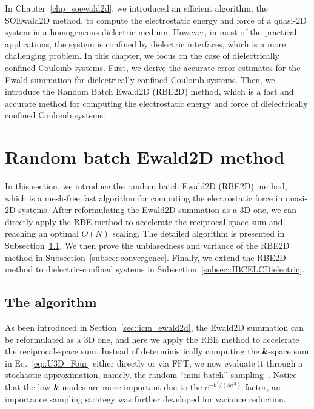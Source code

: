 In Chapter~\ref{chp_soewald2d}, we introduced an efficient algorithm, the SOEwald2D method, to compute the electrostatic energy and force of a quasi-2D system in a homogeneous dielectric medium.
However, in most of the practical applications, the system is confined by dielectric interfaces, which is a more challenging problem.
In this chapter, we focus on the case of dielectrically confined Coulomb systems.
First, we derive the accurate error estimates for the Ewald summation for dielectrically confined Coulomb systems.
Then, we introduce the Random Batch Ewald2D (RBE2D) method, which is a fast and accurate method for computing the electrostatic energy and force of dielectrically confined Coulomb systems.

\section{Random batch Ewald2D method}\label{sec::RBE2D}

In this section, we introduce the random batch Ewald2D (RBE2D) method, which is a mesh-free fast algorithm for computing the electrostatic force in quasi-2D systems.
After reformulating the Ewald2D summation as a 3D one, we can directly apply the RBE method to accelerate the reciprocal-space sum and reaching an optimal $O(N)$ scaling.
The detailed algorithm is presented in Subsection~\ref{subsec::RBE2D_algorithm}.
We then prove the unbiasedness and variance of the RBE2D method in Subsection~\ref{subsec::convergence}.
Finally, we extend the RBE2D method to dielectric-confined systems in Subsection~\ref{subsec::IBCELCDielectric}.

\subsection{The algorithm}\label{subsec::RBE2D_algorithm}

As been introduced in Section~\ref{sec::icm_ewald2d}, the Ewald2D summation can be reformulated as a 3D one, and here we apply the RBE method to accelerate the reciprocal-space sum.
Instead of deterministically computing the $\boldsymbol{k}$-space sum in Eq.~\eqref{eq::U3D_Four} either directly or via FFT, we now evaluate it through a stochastic approximation, namely, the random ``mini-batch'' sampling~\cite{jin2020random}. 
Notice that the low $\boldsymbol{k}$ modes are more important due to the $e^{-k^2/(4\alpha^2)}$ factor, an importance sampling strategy was further developed for variance reduction.

